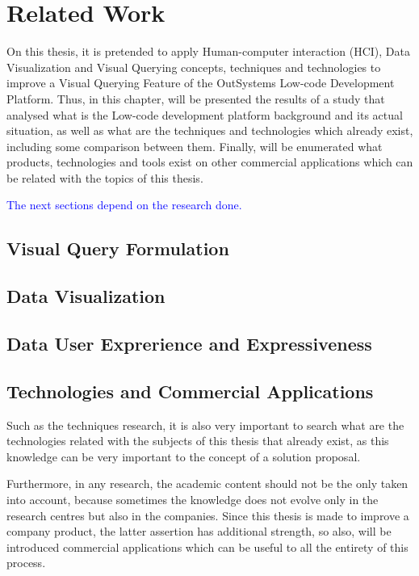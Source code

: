 \chapter{Related Work}
\label{cha:related_work}
On this thesis, it is pretended to apply Human-computer interaction (HCI), Data Visualization and Visual Querying concepts, techniques and technologies to improve a Visual Querying Feature of the OutSystems Low-code Development Platform. Thus, in this chapter, will be presented the results of a study that analysed what is the Low-code development platform background and its actual situation, as well as what are the techniques and technologies which already exist, including some comparison between them. Finally, will be enumerated what products, technologies and tools exist on other commercial applications which can be related with the topics of this thesis.


\textcolor{blue}{The next sections depend on the research done.}

\section{Visual Query Formulation}
\label{sec:visual_query_formulation}

\section{Data Visualization}
\label{sec:data_visualization}

\section{Data User Exprerience and Expressiveness}
\label{sec:data_user_experience_and_expressiveness}

\section{Technologies and Commercial Applications}
\label{sec:technologies_and_commercial_applications}
Such as the techniques research, it is also very important to search what are the technologies related with the subjects of this thesis that already exist, as this knowledge can be very important to the concept of a solution proposal.

Furthermore, in any research, the academic content should not be the only taken into account, because sometimes the knowledge does not evolve only in the research centres but also in the companies. Since this thesis is made to improve a company product, the latter assertion has additional strength, so also, will be introduced commercial applications which can be useful to all the entirety of this process.